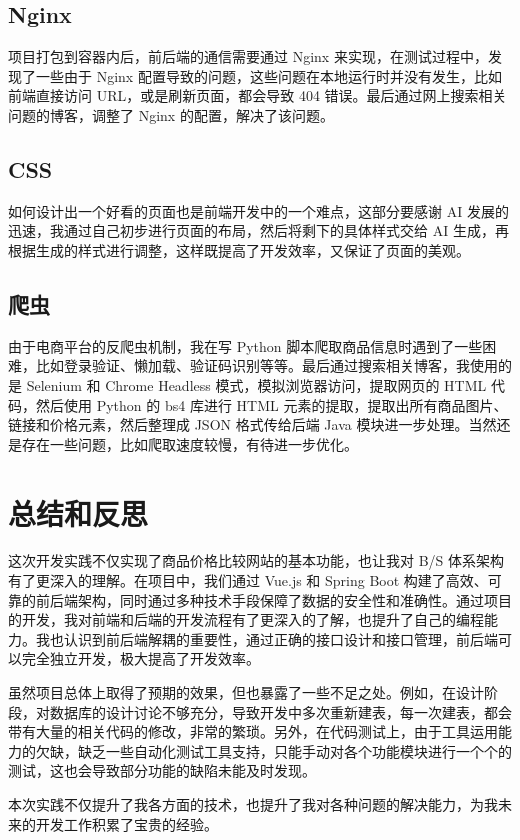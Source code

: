 \documentclass[12pt]{article}
\begin{document}
\subsection{Nginx}
项目打包到容器内后，前后端的通信需要通过 Nginx 来实现，在测试过程中，发现了一些由于 Nginx 配置导致的问题，这些问题在本地运行时并没有发生，比如前端直接访问 URL，或是刷新页面，都会导致 404 错误。最后通过网上搜索相关问题的博客，调整了 Nginx 的配置，解决了该问题。

\subsection{CSS}
如何设计出一个好看的页面也是前端开发中的一个难点，这部分要感谢 AI 发展的迅速，我通过自己初步进行页面的布局，然后将剩下的具体样式交给 AI 生成，再根据生成的样式进行调整，这样既提高了开发效率，又保证了页面的美观。

\subsection{爬虫}
由于电商平台的反爬虫机制，我在写 Python 脚本爬取商品信息时遇到了一些困难，比如登录验证、懒加载、验证码识别等等。最后通过搜索相关博客，我使用的是 Selenium 和 Chrome Headless 模式，模拟浏览器访问，提取网页的 HTML 代码，然后使用 Python 的 bs4 库进行 HTML 元素的提取，提取出所有商品图片、链接和价格元素，然后整理成 JSON 格式传给后端 Java 模块进一步处理。当然还是存在一些问题，比如爬取速度较慢，有待进一步优化。

\section{总结和反思}
这次开发实践不仅实现了商品价格比较网站的基本功能，也让我对 B/S 体系架构有了更深入的理解。在项目中，我们通过 Vue.js 和 Spring Boot 构建了高效、可靠的前后端架构，同时通过多种技术手段保障了数据的安全性和准确性。通过项目的开发，我对前端和后端的开发流程有了更深入的了解，也提升了自己的编程能力。我也认识到前后端解耦的重要性，通过正确的接口设计和接口管理，前后端可以完全独立开发，极大提高了开发效率。

虽然项目总体上取得了预期的效果，但也暴露了一些不足之处。例如，在设计阶段，对数据库的设计讨论不够充分，导致开发中多次重新建表，每一次建表，都会带有大量的相关代码的修改，非常的繁琐。另外，在代码测试上，由于工具运用能力的欠缺，缺乏一些自动化测试工具支持，只能手动对各个功能模块进行一个个的测试，这也会导致部分功能的缺陷未能及时发现。

本次实践不仅提升了我各方面的技术，也提升了我对各种问题的解决能力，为我未来的开发工作积累了宝贵的经验。
\end{document}
